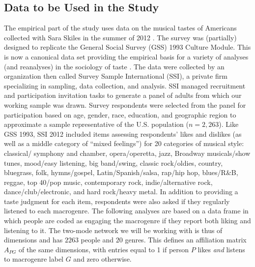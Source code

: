 \documentclass[a4paper,12pt]{extarticle}
\begin{document}
\subsection{Data to be Used in the Study}
The empirical part of the study uses data on the musical tastes of Americans collected with Sara Skiles in the summer of 2012 \citep{lizardo_skiles15, lizardo_skiles16}. The survey was (partially) designed to replicate the General Social Survey (GSS) 1993 Culture Module. This is now a canonical data set providing the empirical basis for a variety of analyses (and reanalyses) in the sociology of taste \citep[e.g.,][]{bryson96, goldberg2011mapping, schultz2010strength, han2003unraveling, tampubolon2008revisiting, okada2017structure}.  The data were collected by an organization then called Survey Sample International (SSI), a private firm specializing in sampling, data collection, and analysis. SSI managed recruitment and participation invitation tasks to generate a panel of adults from which our working sample was drawn. Survey respondents were selected from the panel for participation based on age, gender, race, education, and geographic region to approximate a sample representative of the U.S. population ($n = 2,263$). Like GSS 1993, SSI 2012 included items assessing respondents’ likes and dislikes (as well as a middle category of ``mixed feelings'') for 20 categories of musical style: classical/ symphony and chamber, opera/operetta, jazz, Broadway musicals/show tunes, mood/easy listening, big band/swing, classic rock/oldies, country, bluegrass, folk, hymns/gospel, Latin/Spanish/salsa, rap/hip hop, blues/R\&B, reggae, top 40/pop music, contemporary rock, indie/alternative rock, dance/club/electronic, and hard rock/heavy metal. In addition to providing a taste judgment for each item, respondents were also asked if they regularly listened to each macrogenre. The following analyses are based on a data frame in which people are coded as engaging the macrogenre if they report both liking and listening to it. The two-mode network we will be working with is thus of dimensions and has $2263$ people and $20$ genres. This defines an affiliation matrix $A_{PG}$ of the same dimensions, with entries equal to 1 if person $P$ likes \textit{and} listens to macrogenre label $G$ and zero otherwise. 
\end{document}
